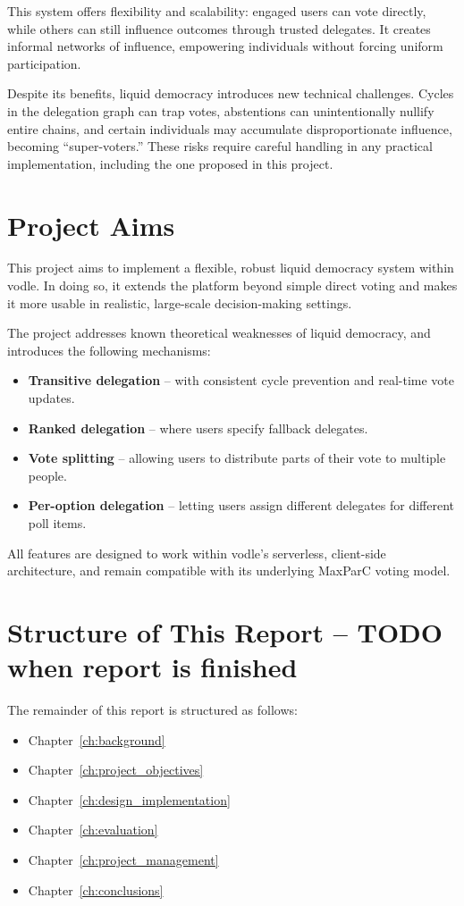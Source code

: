 This system offers flexibility and scalability: engaged users can vote directly, while others can still influence outcomes through trusted delegates. It creates informal networks of influence, empowering individuals without forcing uniform participation.

Despite its benefits, liquid democracy introduces new technical challenges. Cycles in the delegation graph can trap votes, abstentions can unintentionally nullify entire chains, and certain individuals may accumulate disproportionate influence, becoming ``super-voters.'' These risks require careful handling in any practical implementation, including the one proposed in this project.

\section{Project Aims}

This project aims to implement a flexible, robust liquid democracy system within vodle. In doing so, it extends the platform beyond simple direct voting and makes it more usable in realistic, large-scale decision-making settings.

The project addresses known theoretical weaknesses of liquid democracy, and introduces the following mechanisms:
\begin{itemize}
  \item \textbf{Transitive delegation} -- with consistent cycle prevention and real-time vote updates.
  \item \textbf{Ranked delegation} -- where users specify fallback delegates.
  \item \textbf{Vote splitting} -- allowing users to distribute parts of their vote to multiple people.
  \item \textbf{Per-option delegation} -- letting users assign different delegates for different poll items.
\end{itemize}

All features are designed to work within vodle's serverless, client-side architecture, and remain compatible with its underlying MaxParC voting model.

\section{Structure of This Report -- TODO when report is finished}

The remainder of this report is structured as follows:

\begin{itemize}
  \item Chapter~\ref{ch:background}
  \item Chapter~\ref{ch:project_objectives}
  \item Chapter~\ref{ch:design_implementation}
  \item Chapter~\ref{ch:evaluation}
  \item Chapter~\ref{ch:project_management}
  \item Chapter~\ref{ch:conclusions}
\end{itemize}